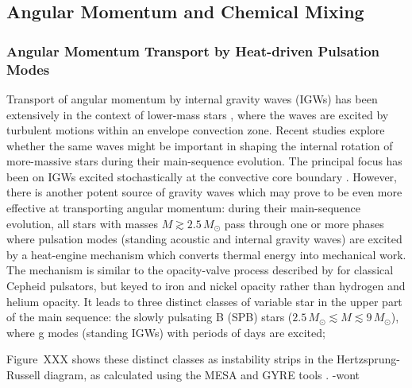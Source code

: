 
\subsection{Angular Momentum and Chemical Mixing}

\subsubsection{Angular Momentum Transport by Heat-driven Pulsation Modes}

Transport of angular momentum by internal gravity waves (IGWs) has been extensively in the context of lower-mass stars  \citep[e.g.,][]{Schatzman:1993,Kumar:1997,Zahn:1997,Talon:2002,Talon:2005,Rogers:2008}, where the waves are excited by turbulent motions within an envelope convection zone. Recent studies explore whether the same waves might be important in shaping the internal rotation of more-massive stars during their main-sequence evolution. The principal focus has been on IGWs excited stochastically at the convective core boundary \citep[e.g.][]{Rogers:2013,Lee:2014,Rogers:2015}. However, there is another potent source of gravity waves which may prove to be even more effective at transporting angular momentum: during their main-sequence evolution, all stars with masses $M \gtrsim 2.5\,M_{\odot}$ pass through one or more phases where pulsation modes (standing acoustic and internal gravity waves) are excited by a heat-engine mechanism which converts thermal energy into mechanical work. The mechanism is similar to the opacity-valve process described by \citet{Eddington:1926} for classical Cepheid pulsators, but keyed to iron and nickel opacity rather than hydrogen and helium opacity. It leads to three distinct classes of variable star in the upper part of the main sequence: the slowly pulsating B (SPB) stars ($2.5\,M_{\odot} \lesssim M \lesssim 9\,M_{\odot}$), where g modes (standing IGWs) with periods of days are excited; 


Figure~XXX shows these distinct classes as instability strips in the Hertzsprung-Russell diagram, as calculated using the MESA and GYRE tools \citep[from][]{Paxton:2015}. 
-wont
